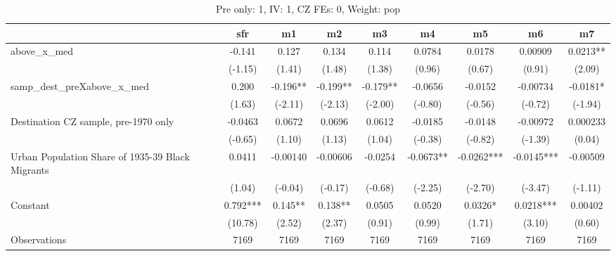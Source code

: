 \begin{table}[htbp]\centering
\def\sym#1{\ifmmode^{#1}\else\(^{#1}\)\fi}
\caption{Pre only: 1, IV: 1, CZ FEs: 0, Weight: pop}
\begin{tabular}{l*{8}{c}}
\toprule
                    &\multicolumn{1}{c}{sfr}&\multicolumn{1}{c}{m1}&\multicolumn{1}{c}{m2}&\multicolumn{1}{c}{m3}&\multicolumn{1}{c}{m4}&\multicolumn{1}{c}{m5}&\multicolumn{1}{c}{m6}&\multicolumn{1}{c}{m7}\\
\midrule
above\_x\_med         &      -0.141   &       0.127   &       0.134   &       0.114   &      0.0784   &      0.0178   &     0.00909   &      0.0213** \\
                    &     (-1.15)   &      (1.41)   &      (1.48)   &      (1.38)   &      (0.96)   &      (0.67)   &      (0.91)   &      (2.09)   \\
\addlinespace
samp\_dest\_preXabove\_x\_med&       0.200   &      -0.196** &      -0.199** &      -0.179** &     -0.0656   &     -0.0152   &    -0.00734   &     -0.0181*  \\
                    &      (1.63)   &     (-2.11)   &     (-2.13)   &     (-2.00)   &     (-0.80)   &     (-0.56)   &     (-0.72)   &     (-1.94)   \\
\addlinespace
Destination CZ sample, pre-1970 only&     -0.0463   &      0.0672   &      0.0696   &      0.0612   &     -0.0185   &     -0.0148   &    -0.00972   &    0.000233   \\
                    &     (-0.65)   &      (1.10)   &      (1.13)   &      (1.04)   &     (-0.38)   &     (-0.82)   &     (-1.39)   &      (0.04)   \\
\addlinespace
Urban Population Share of 1935-39 Black Migrants&      0.0411   &    -0.00140   &    -0.00606   &     -0.0254   &     -0.0673** &     -0.0262***&     -0.0145***&    -0.00509   \\
                    &      (1.04)   &     (-0.04)   &     (-0.17)   &     (-0.68)   &     (-2.25)   &     (-2.70)   &     (-3.47)   &     (-1.11)   \\
\addlinespace
Constant            &       0.792***&       0.145** &       0.138** &      0.0505   &      0.0520   &      0.0326*  &      0.0218***&     0.00402   \\
                    &     (10.78)   &      (2.52)   &      (2.37)   &      (0.91)   &      (0.99)   &      (1.71)   &      (3.10)   &      (0.60)   \\
\midrule
Observations        &        7169   &        7169   &        7169   &        7169   &        7169   &        7169   &        7169   &        7169   \\

\end{tabular}
\end{table}
